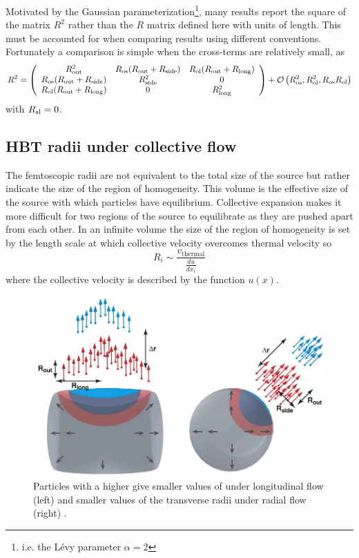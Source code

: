 Motivated by the Gaussian parameterization\footnote{i.e. the L\'evy parameter $\alpha = 2$}, many results report the square of the matrix $R^2$ rather than the $R$ matrix defined here with units of length.
This must be accounted for when comparing results using different conventions.
Fortunately a comparison is simple when the cross-terms are relatively small, as
\begin{equation}
  R^2 = \left( \begin{array}{ccc}
  R_{\mathrm{out}}^2 & R_{\mathrm{os}}(R_{\mathrm{out}}+R_{\mathrm{side}}) & R_{\mathrm{ol}}(R_{\mathrm{out}}+R_{\mathrm{long}}) \\
  R_{\mathrm{os}}(R_{\mathrm{out}}+R_{\mathrm{side}}) & R_{\mathrm{side}}^2 & 0 \\
  R_{\mathrm{ol}}(R_{\mathrm{out}}+R_{\mathrm{long}}) & 0 & R_{\mathrm{long}}^2
  \end{array} \right) + \mathcal{O}\left(  R_{\mathrm{os}}^2, R_{\mathrm{ol}}^2, R_{\mathrm{os}} R_{\mathrm{ol}}  \right)
\end{equation}
with $R_{\mathrm{sl}} = 0$.

\subsection{HBT radii under collective flow}

The femtoscopic radii are not equivalent to the total size of the source but rather indicate the size of the region of homogeneity.
This volume is the effective size of the source with which particles have equilibrium.
Collective expansion makes it more difficult for two regions of the source to equilibrate as they are pushed apart from each other.
In an infinite volume the size of the region of homogeneity is set by the length scale at which collective velocity overcomes thermal velocity \cite{Lisa:2005dd} so
\begin{equation}
R_i \sim \frac{v_\textrm{thermal}}{\frac{du}{dx_i}}
\end{equation}
where the collective velocity is described by the function $u(x)$.

\begin{figure}[t]
  \includegraphics{hbt_radii_flow.png}
  \caption{Particles with a higher \pt give smaller values of \Rlong under longitudinal flow (left) and smaller values of the transverse radii under radial flow (right) \cite{Lisa:2005dd}.}
  \label{fig:hbt_flow}
\end{figure}

